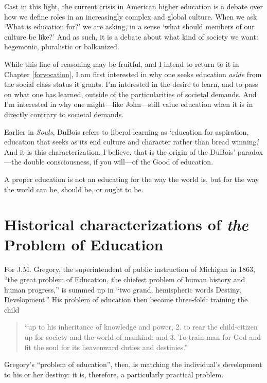 Cast in this light, the current crisis in American higher education is a debate over how we define roles in an increasingly complex and global culture. When we ask `What is education for?' we are asking, in a sense `what should members of our culture be like?' And as such, it is a debate about what kind of society we want: hegemonic, pluralistic or balkanized.

While this line of reasoning may be fruitful, and I intend to return to it in Chapter \ref{forvocation}, I am first interested in why one seeks education \emph{aside} from the social class status it grants. I'm interested in the desire to learn, and to pass on what one has learned, outside of the particularities of societal demands. And I'm interested in why one might---like John---still value education when it is in directly contrary to societal demands.

Earlier in \emph{Souls}, DuBois refers to liberal learning as `education for aspiration, education that seeks as its end culture and character rather than bread winning.' And it is this characterization, I believe, that is the origin of the DuBois' paradox---the double consciousness, if you will---of the Good of education. 

A proper education is not an educating for the way the world is, but for the way the world can be, should be, or ought to be. 

\section{Historical characterizations of \emph{the} Problem of Education}
\label{historicalcharacterizationsoftheproblemofeducation}

For J.M. Gregory, the superintendent of public instruction of Michigan in 1863, ``the great problem of Education, the chiefest problem of human history and human progress,'' is summed up in ``two grand, hemispheric words Destiny, Development.'' His problem of education then become three-fold: training the child

\begin{quote}

``up to his inheritance of knowledge and power, 2. to rear the child-citizen up for society and the world of mankind; and 3. To train man for God and fit the soul for its heavenward duties and destinies.''~\citep[p. 436]{Gregory:1864wj} 
\end{quote}

Gregory's ``problem of education'', then, is matching the individual's development to his or her destiny: it is, therefore, a particularly practical problem.

